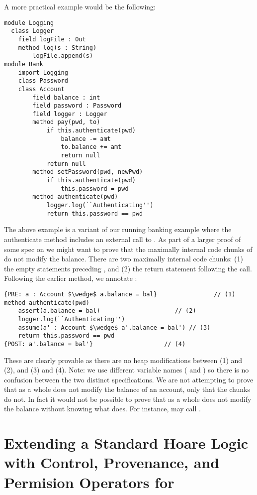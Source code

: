 \documentclass[11pt]{article} %
\theoremstyle{definition}
\begin{document}
A more practical example would be the following:
\begin{lstlisting}[language = Chainmail, frame = lines]
module Logging
  class Logger
  	field logFile : Out
  	method log(s : String)
  		logFile.append(s)
module Bank
	import Logging
	class Password
	class Account
		field balance : int
		field password : Password
		field logger : Logger
		method pay(pwd, to)
			if this.authenticate(pwd)
				balance -= amt
				to.balance += amt
				return null
			return null
		method setPassword(pwd, newPwd)
			if this.authenticate(pwd)
				this.password = pwd
		method authenticate(pwd)
			logger.log(``Authenticating'')
			return this.password == pwd
\end{lstlisting}
The above example is a variant of our running banking example
where the authenticate method includes an external call to 
. As part of a larger proof of some \Nec spec on 
we might want to prove that the maximally internal code chunks 
of  do not modify the balance. There are two 
maximally internal code chunks: (1) the empty statements preceding 
, and (2) the return statement
following the call. Following the earlier method, we annotate 
:
\begin{lstlisting}[language = Chainmail, frame = lines, mathescape = true]
{PRE: a : Account $\wedge$ a.balance = bal}                // (1)
method authenticate(pwd)
	assert(a.balance = bal)                     // (2)
	logger.log(``Authenticating'')
	assume(a' : Account $\wedge$ a'.balance = bal') // (3)
	return this.password == pwd
{POST: a'.balance = bal'}                    // (4)
\end{lstlisting}
These are clearly provable as there are no heap modifications between
(1) and (2), and (3) and (4). Note: we use different variable names ( 
and ) so there is no confusion between the two distinct 
specifications. We are not attempting to prove that 
as a whole does not modify the balance of an account, only that the chunks 
do not. In fact it would not be possible to prove that 
as a whole does not modify the balance without knowing what  does.
For instance,  may call .


\section{Extending a Standard Hoare Logic with Control, Provenance, and Permision Operators for \Nec}
\end{document}
